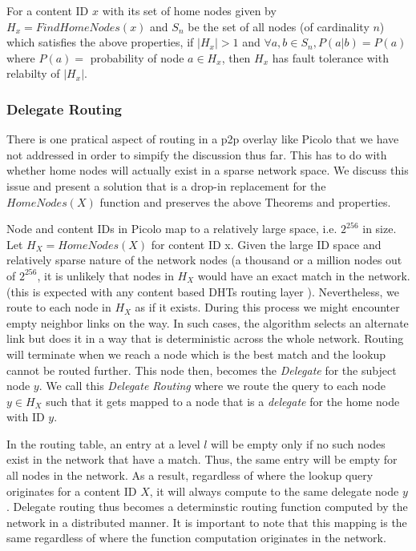 \begin{theorem}
   
    For a content ID \(x\) with its set of home nodes given by \( H_x = FindHomeNodes(x) \) and \(S_n\) be the set of
all nodes (of cardinality \(n\)) which satisfies the above properties, if \( |H_x| > 1 \) and \( \forall a, b \in S_n,
    P(a|b) = P(a) \) where \( P(a) = \) probability of node \(a \in H_x \), then \(H_x\) has fault tolerance with
    relabilty of \( | H_x | \).
\end{theorem}

\subsubsection{Delegate Routing}

There is one pratical aspect of routing in a p2p overlay like Picolo that we have not addressed in order to
simpify the discussion thus far.  This has to do with whether home nodes will actually exist in a sparse network space.
We discuss this issue and present a solution that is a drop-in replacement for the \(HomeNodes(X)\) function and
preserves the above Theorems and properties.

Node and content IDs in Picolo map to a relatively large space, i.e. \(2^{256}\) in size. Let \( H_X =
HomeNodes(X)\) for content ID x. Given the large ID space and relatively sparse nature of the network nodes (a
thousand or a million nodes out of \(2^{256}\), it is unlikely that nodes in \(H_X\) would have an exact match in the
network. (this is expected with any content based DHTs routing layer \cite{Stoica_2001, Rowstron_2001}).
Nevertheless, we route to each node in \(H_X\) as if it exists. During this process we might encounter empty neighbor
links on the way. In such cases, the algorithm selects an alternate link but does it in a way that is deterministic
across the whole network. Routing will terminate when we reach a node which is the best match and the lookup cannot be
routed further. This node then, becomes the {\em Delegate} for the subject node \(y\). We call this {\em Delegate
Routing} where we route the query to each node \(y \in H_X \) such that it gets mapped to a node that is a {\em
delegate} for the home node with ID \(y\).

In the routing table, an entry at a level \(l\) will be empty only if no such nodes exist in the network that have a
match. Thus, the same entry will be empty for all nodes in the network. As a result, regardless of where the lookup
query originates for a content ID \(X\), it will always compute to the same delegate node \(y\). Delegate routing thus
becomes a determinstic routing function computed by the network in a distributed manner. It is important to note that
this mapping is the same regardless of where the function computation originates in the network.


